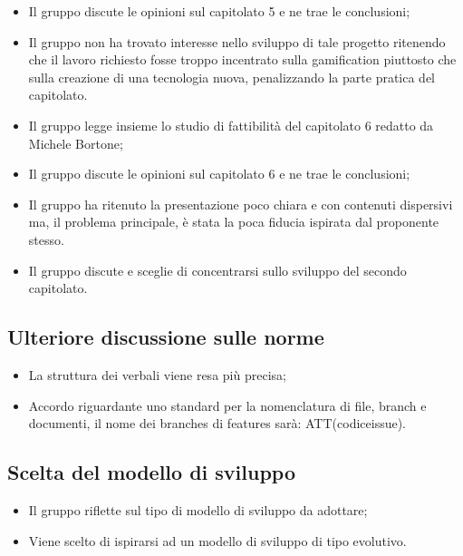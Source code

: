\documentclass[11pt,a4paper]{article}
\begin{document}
\begin{itemize}
	\item Il gruppo discute le opinioni sul capitolato 5 e ne trae le conclusioni;
	\item Il gruppo non ha trovato interesse nello sviluppo di tale progetto ritenendo che il lavoro richiesto fosse troppo incentrato sulla gamification piuttosto che sulla creazione di una tecnologia nuova, penalizzando la parte pratica del capitolato.  
	\item Il gruppo legge insieme lo studio di fattibilità del capitolato 6 redatto da Michele Bortone;
	\item Il gruppo discute le opinioni sul capitolato 6 e ne trae le conclusioni;
	\item Il gruppo ha ritenuto la presentazione poco chiara e con contenuti dispersivi ma, il problema principale, è stata la poca fiducia ispirata dal proponente stesso. 
	\item Il gruppo discute e sceglie di concentrarsi sullo sviluppo del secondo capitolato.
	\end{itemize}

	\subsection{Ulteriore discussione sulle norme}
	\begin{itemize}
	\item La struttura dei verbali viene resa più precisa;
	\item Accordo riguardante uno standard per la nomenclatura di file, branch e documenti, il nome dei branches di features sarà: ATT(codiceissue).
	\end{itemize}
	\subsection{Scelta del modello di sviluppo}	
	\begin{itemize}
	\item Il gruppo riflette sul tipo di modello di sviluppo da adottare;
	\item Viene scelto di ispirarsi ad un modello di sviluppo di tipo evolutivo.
	\end{itemize}
\end{document}

